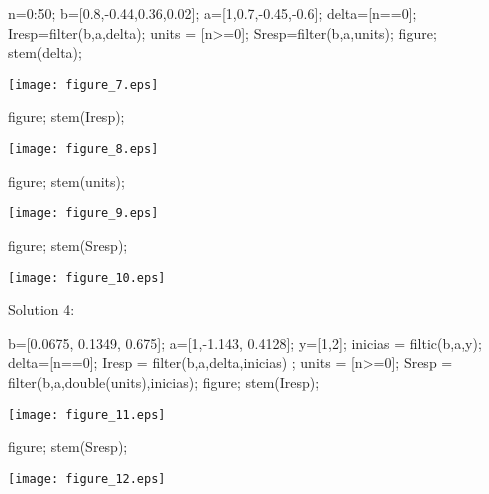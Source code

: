 \documentclass[12pt, onecolumn]{IEEEtran}
\begin{document}
\begin{matlabcode}
n=0:50; %
b=[0.8,-0.44,0.36,0.02]; 
a=[1,0.7,-0.45,-0.6]; 
delta=[n==0]; 
Iresp=filter(b,a,delta);
units = [n>=0];
Sresp=filter(b,a,units); 
figure; 
stem(delta); 
\end{matlabcode}
\begin{center}
\texttt{[image: figure\_7.eps]}
\end{center}
\begin{matlabcode}
figure;
stem(Iresp);
\end{matlabcode}
\begin{center}
\texttt{[image: figure\_8.eps]}
\end{center}
\begin{matlabcode}
figure; 
stem(units);
\end{matlabcode}
\begin{center}
\texttt{[image: figure\_9.eps]}
\end{center}
\begin{matlabcode}
figure; 
stem(Sresp);
\end{matlabcode}
\begin{center}
\texttt{[image: figure\_10.eps]}
\end{center}

\begin{par}
\begin{flushleft}
Solution 4:
\end{flushleft}
\end{par}

\begin{matlabcode}
b=[0.0675, 0.1349, 0.675];  
a=[1,-1.143, 0.4128]; 
y=[1,2]; 
inicias = filtic(b,a,y); 
delta=[n==0]; 
Iresp = filter(b,a,delta,inicias) ;
units = [n>=0];
Sresp = filter(b,a,double(units),inicias);
figure;
stem(Iresp);
\end{matlabcode}
\begin{center}
\texttt{[image: figure\_11.eps]}
\end{center}
\begin{matlabcode}
figure;
stem(Sresp);
\end{matlabcode}
\begin{center}
\texttt{[image: figure\_12.eps]}
\end{center}
\end{document}
